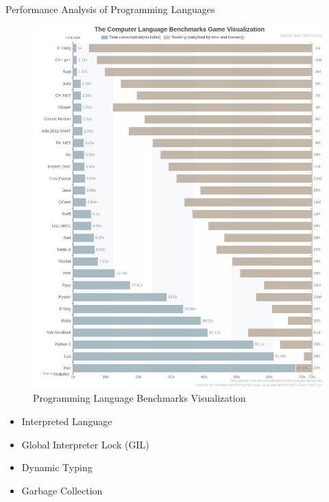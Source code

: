 \documentclass[10pt]{beamer}
\let\olditem\item
\renewcommand\item{\olditem\justifying}
\newcommand{\mypause}{\pause}
\begin{document}
	\begin{frame}{Performance Analysis of Programming Languages}
		\begin{minipage}{0.5\linewidth}
			\begin{figure}
				\centering
				\includegraphics[width=\linewidth]{ranking}
				\caption{Programming Language Benchmarks Visualization \cite{actions2024GoodManWEN}}
			\end{figure}
		\end{minipage}
		\mypause
		\begin{minipage}{0.5\linewidth}
			\begin{itemize}
				\item Interpreted Language
				\item Global Interpreter Lock (GIL)
				\item Dynamic Typing
				\item Garbage Collection
			\end{itemize}
		\end{minipage}
	\end{frame}
	
\end{document}
